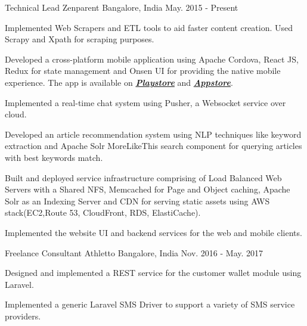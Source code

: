 \begin{cventries}
  \cventry
    {Technical Lead}
    {Zenparent}
    {Bangalore, India}
    {May. 2015 - Present}
    {
      \begin{cvitems}
        \item {Implemented Web Scrapers and ETL tools to aid faster content creation. Used Scrapy and Xpath for scraping purposes.}
        \item {Developed a cross-platform mobile application using Apache Cordova, React JS, Redux for state management and Onsen UI for providing the native mobile experience. The app is available on \href{https://play.google.com/store/apps/details?id=com.zenparent.mobileapp}{\textit{\textbf{Playstore}}} and \href{https://itunes.apple.com/us/app/zenparent/id1221296168}{\textit{\textbf{Appstore}}}.}
        \item {Implemented a real-time chat system using Pusher, a Websocket service over cloud.}
        \item {Developed an article recommendation system using NLP techniques like keyword extraction and Apache Solr MoreLikeThis search component for querying articles with best keywords match.}
        \item {Built and deployed service infrastructure comprising of Load Balanced Web Servers with a Shared NFS, Memcached for Page and Object caching, Apache Solr as an Indexing Server and CDN for serving static assets using AWS stack(EC2,Route 53, CloudFront, RDS, ElastiCache).}
        \item {Implemented the website UI and backend services for the web and mobile clients.}
    \end{cvitems}
    }
   \cventry
    {Freelance Consultant}
    {Athletto}
    {Bangalore, India}
    {Nov. 2016 - May. 2017}
    {
      \begin{cvitems}
        \item {Designed and implemented a REST service for the customer wallet module using Laravel.}
        \item{Implemented a generic Laravel SMS Driver to support a variety of SMS service providers.}
      \end{cvitems}
    }

\end{cventries}
